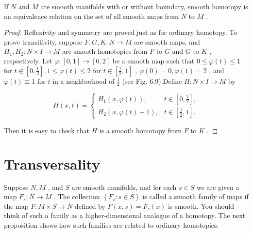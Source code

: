 \begin{lemma}
\label{lem:6-28}
\leanok
{}
If $N$ and $M$ are smooth manifolds with or without boundary, smooth homotopy is an equivalence relation on the set of all smooth maps from $N$ to $M$ .
\end{lemma}

\begin{proof}
\leanok
Reflexivity and symmetry are proved just as for ordinary homotopy. To prove transitivity, suppose $F, G, K : N \rightarrow  M$ are smooth maps, and ${H}_{1},{H}_{2} : N \times  I \rightarrow  M$ are smooth homotopies from $F$ to $G$ and $G$ to $K$ , respectively. Let $\varphi  : \left\lbrack  {0,1}\right\rbrack   \rightarrow  \left\lbrack  {0,2}\right\rbrack$ be a smooth map such that $0 \leq  \varphi \left( t\right)  \leq  1$ for $t \in  \left\lbrack  {0,\frac{1}{2}}\right\rbrack  ,1 \leq  \varphi \left( t\right)  \leq  2$ for $t \in  \left\lbrack  {\frac{1}{2},1}\right\rbrack$ , $\varphi \left( 0\right)  = 0,\varphi \left( 1\right)  = 2$ , and $\varphi \left( t\right)  \equiv  1$ for $t$ in a neighborhood of $\frac{1}{2}$ (see Fig. 6.9).Define $H : N \times  I \rightarrow  M$ by

\[
H\left( {x, t}\right)  = \left\{  \begin{array}{ll} {H}_{1}\left( {x,\varphi \left( t\right) }\right) , & t \in  \left\lbrack  {0,\frac{1}{2}}\right\rbrack  , \\  {H}_{2}\left( {x,\varphi \left( t\right)  - 1}\right) , & t \in  \left\lbrack  {\frac{1}{2},1}\right\rbrack  . \end{array}\right.
\]

Then it is easy to check that $H$ is a smooth homotopy from $F$ to $K$ .
\end{proof}


\section{Transversality}

\begin{definition}
\label{def:6-44-extra-2}
\leanok
Suppose $N, M$ , and $S$ are smooth manifolds, and for each $s \in  S$ we are given a map ${F}_{s} : N \rightarrow  M$ . The collection $\left\{  {{F}_{s} : s \in  S}\right\}$ is called a smooth family of maps if the map $F : M \times  S \rightarrow  N$ defined by $F\left( {x, s}\right)  = {F}_{s}\left( x\right)$ is smooth. You should think of such a family as a higher-dimensional analogue of a homotopy. The next proposition shows how such families are related to ordinary homotopies.
\end{definition}

